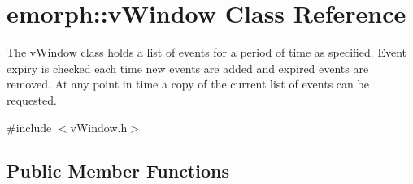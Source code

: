 \hypertarget{classemorph_1_1vWindow}{\section{emorph\-:\-:v\-Window Class Reference}
\label{classemorph_1_1vWindow}
}


The \hyperlink{classemorph_1_1vWindow}{v\-Window} class holds a list of events for a period of time as specified. Event expiry is checked each time new events are added and expired events are removed. At any point in time a copy of the current list of events can be requested.  




{\ttfamily \#include $<$v\-Window.\-h$>$}

\subsection*{Public Member Functions}

